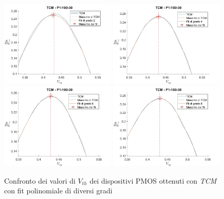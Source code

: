 \documentclass[12pt, letterpaper]{book}
\begin{document}
\begin{figure}[h!]
\centering
 \includegraphics[width=0.49\textwidth]{TCM-P1-100-30-grado2}
 \includegraphics[width=0.49\textwidth]{TCM-P1-100-30-grado4}
 \includegraphics[width=0.49\textwidth]{TCM-P1-100-30-grado6}
 \includegraphics[width=0.49\textwidth]{TCM-P1-100-30-grado8}
 \caption{Confronto dei valori di $V_{th}$ dei dispositivi PMOS ottenuti con \emph{TCM} con fit polinomiale di diversi gradi}
\end{figure}
\end{document}
